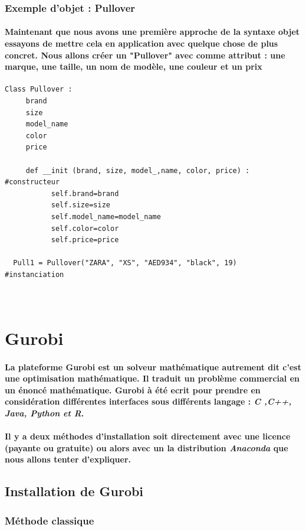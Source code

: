 \documentclass[a4paper, 12pt, twoside]{article}
\begin{document}
\subsubsection{Exemple d'objet : Pullover}
\paragraph{Maintenant que nous avons une première approche de la syntaxe objet essayons de mettre cela en application avec quelque chose de plus concret. Nous allons créer un "Pullover" avec comme attribut : une marque, une taille, un nom de modèle, une couleur et un prix }
\begin{verbatim}
Class Pullover : 
     brand
     size
     model_name
     color
     price
   
     def __init (brand, size, model_,name, color, price) :       #constructeur
           self.brand=brand
           self.size=size
           self.model_name=model_name
           self.color=color
           self.price=price
          
  Pull1 = Pullover("ZARA", "XS", "AED934", "black", 19)         #instanciation
  
          
\end{verbatim}
\newpage
\section{Gurobi}
\paragraph{La plateforme Gurobi est un solveur mathématique autrement dit c'est une optimisation mathématique. Il traduit un problème commercial en un énoncé mathématique. Gurobi à été ecrit pour prendre en considération différentes interfaces sous différents langage : \textit{C ,C++, Java, Python et R}.}

\paragraph{Il y a deux méthodes d'installation soit directement avec une licence (payante ou gratuite) ou alors avec un la distribution \textit{Anaconda} que nous allons tenter d'expliquer.}

\subsection{Installation de Gurobi}
\subsubsection{Méthode classique }
\end{document}
